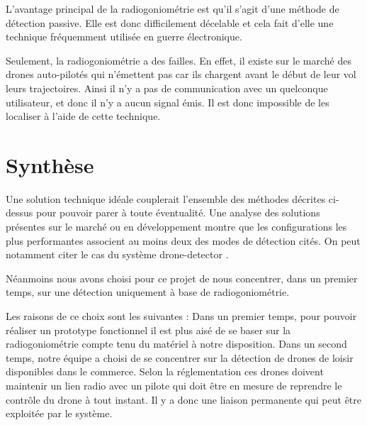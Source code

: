 L'avantage principal de la radiogoniométrie est qu'il s'agit d'une méthode de détection passive. Elle est donc difficilement décelable et cela fait d'elle une technique fréquemment utilisée en guerre électronique. 

Seulement, la radiogoniométrie a des failles. En effet, il existe sur le marché des drones auto-pilotés qui n'émettent pas car ils chargent avant le début de leur vol leurs trajectoires. Ainsi il n'y a pas de communication avec un quelconque utilisateur, et donc il n'y a aucun signal émis. Il est donc impossible de les localiser à l'aide de cette technique.





\section{Synthèse}

Une solution technique idéale couplerait l'ensemble des méthodes décrites ci-dessus pour pouvoir parer à toute éventualité. Une analyse des solutions présentes sur le marché ou en développement montre que les configurations les plus performantes associent au moins deux des modes de détection cités. On peut notamment citer le cas du système drone-detector \cite{dronedetector}.

Néanmoins nous avons choisi pour ce projet de nous concentrer, dans un premier temps, sur une détection uniquement à base de radiogoniométrie.

Les raisons de ce choix sont les suivantes : Dans un premier temps, pour pouvoir réaliser un prototype fonctionnel il est plus aisé de se baser sur la radiogoniométrie compte tenu du matériel à notre disposition. Dans un second temps, notre équipe a choisi de se concentrer sur la détection de drones de loisir disponibles dans le commerce. Selon la réglementation ces drones doivent maintenir un lien radio avec un pilote qui doit être en mesure de reprendre le contrôle du drone à tout instant. Il y a donc une liaison permanente qui peut être exploitée par le système.








